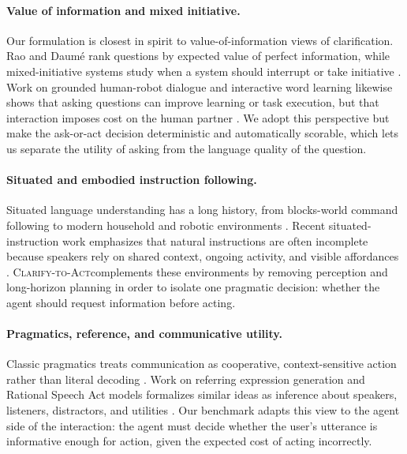 \documentclass{article} %
\newcommand{\task}{\textsc{Clarify-to-Act}}
\begin{document}
\paragraph{Value of information and mixed initiative.}
Our formulation is closest in spirit to value-of-information views of clarification. Rao and Daum{\'e} rank questions by expected value of perfect information, while mixed-initiative systems study when a system should interrupt or take initiative \citep{rao2018learning,horvitz1999principles}. Work on grounded human-robot dialogue and interactive word learning likewise shows that asking questions can improve learning or task execution, but that interaction imposes cost on the human partner \citep{thomason2019improving,yu2017learning}. We adopt this perspective but make the ask-or-act decision deterministic and automatically scorable, which lets us separate the utility of asking from the language quality of the question.

\paragraph{Situated and embodied instruction following.}
Situated language understanding has a long history, from blocks-world command following to modern household and robotic environments \citep{winograd1972understanding,tellex2011understanding,shridhar2020alfred,padmakumar2022teach,ahn2022saycan}. Recent situated-instruction work emphasizes that natural instructions are often incomplete because speakers rely on shared context, ongoing activity, and visible affordances \citep{bisk2020experience,min2024situated}. \task complements these environments by removing perception and long-horizon planning in order to isolate one pragmatic decision: whether the agent should request information before acting.

\paragraph{Pragmatics, reference, and communicative utility.}
Classic pragmatics treats communication as cooperative, context-sensitive action rather than literal decoding \citep{grice1975logic,sperber1986relevance,clark1986referring,clark1996using}. Work on referring expression generation and Rational Speech Act models formalizes similar ideas as inference about speakers, listeners, distractors, and utilities \citep{dale1995computational,frank2012predicting,goodman2016pragmatic,monroe2017colors,golland2010game}. Our benchmark adapts this view to the agent side of the interaction: the agent must decide whether the user's utterance is informative enough for action, given the expected cost of acting incorrectly.
\end{document}
